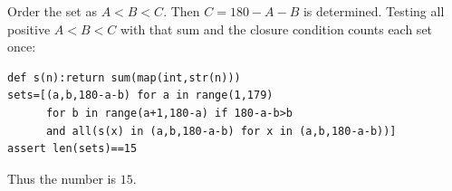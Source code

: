 Order the set as $ A<B<C $. Then $ C=180-A-B $ is determined. Testing all positive $ A<B<C $ with that sum and the closure condition counts each set once:
\begin{verbatim}
def s(n):return sum(map(int,str(n)))
sets=[(a,b,180-a-b) for a in range(1,179)
      for b in range(a+1,180-a) if 180-a-b>b
      and all(s(x) in (a,b,180-a-b) for x in (a,b,180-a-b))]
assert len(sets)==15
\end{verbatim}
Thus the number is $\boxed{15}$.

